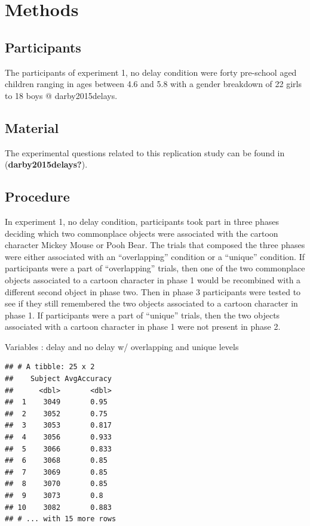 \documentclass[
  english,
  man]{article}
\begin{document}
\hypertarget{methods}{%
\section{Methods}\label{methods}}

\hypertarget{participants}{%
\subsection{Participants}\label{participants}}

The participants of experiment 1, no delay condition were forty pre-school aged children ranging in ages between 4.6 and 5.8 with a gender breakdown of 22 girls to 18 boys @ darby2015delays.

\hypertarget{material}{%
\subsection{Material}\label{material}}

The experimental questions related to this replication study can be found in (\textbf{darby2015delays?}).

\hypertarget{procedure}{%
\subsection{Procedure}\label{procedure}}

In experiment 1, no delay condition, participants took part in three phases deciding which two commonplace objects were associated with the cartoon character Mickey Mouse or Pooh Bear. The trials that composed the three phases were either associated with an ``overlapping'' condition or a ``unique'' condition. If participants were a part of ``overlapping'' trials, then one of the two commonplace objects associated to a cartoon character in phase 1 would be recombined with a different second object in phase two. Then in phase 3 participants were tested to see if they still remembered the two objects associated to a cartoon character in phase 1. If participants were a part of ``unique'' trials, then the two objects associated with a cartoon character in phase 1 were not present in phase 2.

Variables : delay and no delay w/ overlapping and unique levels

\begin{verbatim}
## # A tibble: 25 x 2
##    Subject AvgAccuracy
##      <dbl>       <dbl>
##  1    3049       0.95 
##  2    3052       0.75 
##  3    3053       0.817
##  4    3056       0.933
##  5    3066       0.833
##  6    3068       0.85 
##  7    3069       0.85 
##  8    3070       0.85 
##  9    3073       0.8  
## 10    3082       0.883
## # ... with 15 more rows
\end{verbatim}
\end{document}
